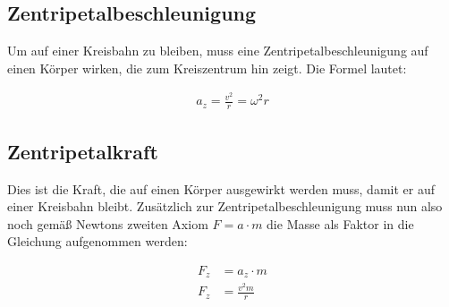 \subsection{Zentripetalbeschleunigung}
Um auf einer Kreisbahn zu bleiben, muss eine Zentripetalbeschleunigung auf einen Körper wirken, die zum Kreiszentrum hin zeigt. Die Formel lautet:

\begin{align}
	a_z=\frac{v^2}{r}=\omega^2 r
\end{align}


\subsection{Zentripetalkraft}

Dies ist die Kraft, die auf einen Körper ausgewirkt werden muss, damit er auf einer Kreisbahn bleibt. Zusätzlich zur Zentripetalbeschleunigung muss nun also noch gemäß Newtons zweiten Axiom $F=a \cdot m$ die Masse als Faktor in die Gleichung aufgenommen werden:

\begin{align}
	F_z &= a_z \cdot m \\
	F_z &= \frac{v^{2}m}{r}
\end{align}
